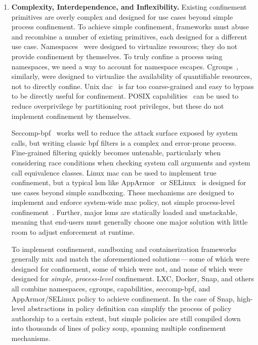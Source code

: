 \begin{enumerate}[font=\bfseries]
  \item \textbf{Complexity, Interdependence, and Inflexibility.}
    Existing confinement primitives are overly complex and designed for use cases beyond
    simple process confinement. To achieve simple confinement, frameworks must abuse and
    recombine a number of existing primitives, each designed for a different use case.
    Namespaces~\cite{biederman2006_namespaces, linux_namespaces} were designed to
    virtualize resources; they do not provide confinement by themselves. To truly confine
    a process using namespaces, we need a way to account for namespace escapes.
    Cgroups~\cite{cgroups}, similarly, were designed to virtualize the availability of
    quantifiable resources, not to directly confine. Unix
    \gls{dac}~\cite{jaeger2008_os_security, van_oorschot2020_tools_jewels} is far too
    coarse-grained and easy to bypass to be directly useful for confinement. POSIX
    capabilities~\cite{posix_capabilities} can be used to reduce overprivilege by
    partitioning root privileges, but these do not implement confinement by themselves.

    Seccomp-bpf~\cite{seccomp, edge2015_seccomp} works well to reduce the attack surface
    exposed by system calls, but writing classic \gls{bpf} filters is a complex and
    error-prone process. Fine-grained filtering quickly becomes untenable, particularly
    when considering race conditions when checking system call arguments and system call
    equivalence classes.  Linux \gls{mac} can be used to implement true confinement, but
    a typical \gls{lsm} like AppArmor~\cite{cowan2000_apparmor} or
    SELinux~\cite{smalley2001_selinux} is designed for use cases beyond simple sandboxing.
    These mechanisms are designed to implement and enforce system-wide \gls{mac} policy,
    not simple process-level confinement~\cite{belair2019_leveraging}. Further, major
    \glspl{lsm} are statically loaded and unstackable, meaning that end-users must
    generally choose one major solution with little room to adjust enforcement at runtime.

    To implement confinement, sandboxing and containerization frameworks generally mix and
    match the aforementioned solutions\,---\,some of which were designed for confinement,
    some of which were not, and none of which were designed for \textit{simple,
    process-level} confinement. LXC, Docker, Snap, and others all combine namespaces,
    cgroups, capabilities, seccomp-bpf, and AppArmor/SELinux policy to achieve
    confinement. In the case of Snap, high-level abstractions in policy definition can
    simplify the process of policy authorship to a certain extent, but simple policies
    are still compiled down into thousands of lines of policy soup, spanning multiple
    confinement mechanisms.


\end{enumerate}

